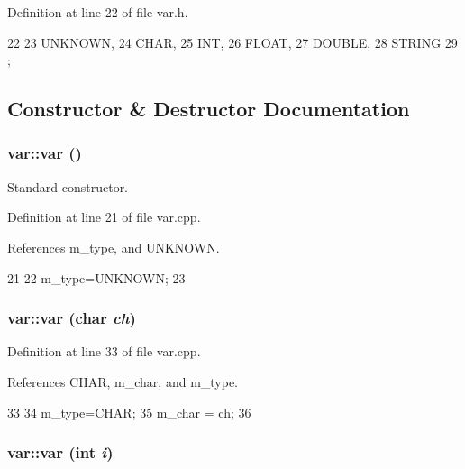 


Definition at line 22 of file var.h.


\begin{DoxyCode}
22             {
23     UNKNOWN,
24     CHAR,
25     INT,
26     FLOAT,
27     DOUBLE,
28     STRING
29   };
\end{DoxyCode}


\subsection{Constructor \& Destructor Documentation}
\hypertarget{classvar_af87bf2817f89678071ac7588a85a7f36}{
\subsubsection[{var}]{\setlength{\rightskip}{0pt plus 5cm}var::var ()}}
\label{classvar_af87bf2817f89678071ac7588a85a7f36}


Standard constructor. 

Definition at line 21 of file var.cpp.

References m\_\-type, and UNKNOWN.


\begin{DoxyCode}
21            {
22   m_type=UNKNOWN;
23 }
\end{DoxyCode}
\hypertarget{classvar_a4afcdfc96cfac4b68e92415698f7e9de}{
\subsubsection[{var}]{\setlength{\rightskip}{0pt plus 5cm}var::var (char {\em ch})}}
\label{classvar_a4afcdfc96cfac4b68e92415698f7e9de}


Definition at line 33 of file var.cpp.

References CHAR, m\_\-char, and m\_\-type.


\begin{DoxyCode}
33                   {
34   m_type=CHAR;
35   m_char = ch;
36 }
\end{DoxyCode}
\hypertarget{classvar_a5fc966797c6c91705d714f5401b18eee}{
\subsubsection[{var}]{\setlength{\rightskip}{0pt plus 5cm}var::var (int {\em i})}}
\label{classvar_a5fc966797c6c91705d714f5401b18eee}


